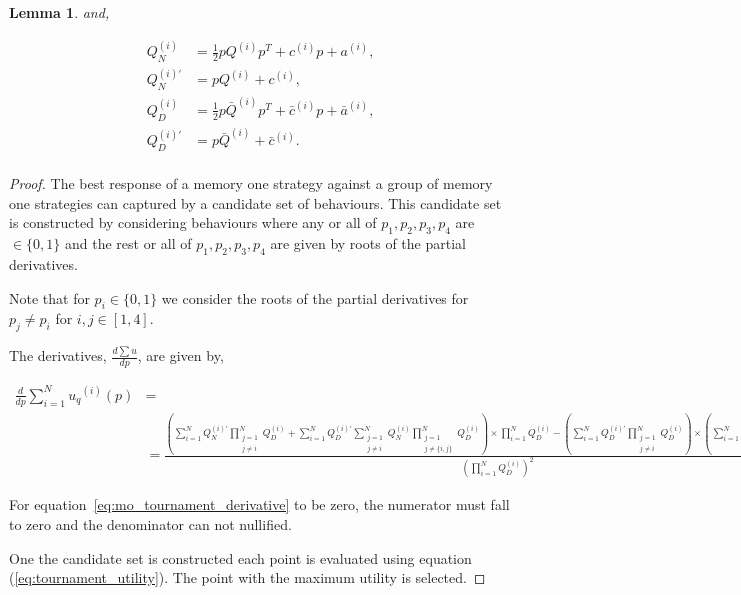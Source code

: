 \documentclass[10pt]{article}
\newtheorem{lemma}[theorem]{Lemma}
\begin{document}
\begin{lemma}
    and,

    \begin{align*}
        Q_{N}^{(i) } & = \frac{1}{2} pQ^{(i)} p^T + c^{(i)} p + a^ {(i)}, \\
        Q_{N}^{(i)'} & =  pQ^{(i)} + c^{(i)}, \\
        Q_{D}^{(i) } & = \frac{1}{2} p\bar{Q}^{(i)} p^T + \bar{c}^{(i)} p + \bar{a}^ {(i)}, \\
        Q_{D}^{(i)'} & =  p\bar{Q}^{(i)} + \bar{c}^{(i)}. \\
    \end{align*}
\end{lemma}

\begin{proof}
    The best response of a memory one strategy against a group of memory
    one strategies can captured by a candidate set of behaviours. This candidate
    set is constructed by considering behaviours where any or all of \(p_1, p_2, p_3, p_4\)
    are \(\in \{0, 1\}\) and the rest or all of \(p_1, p_2, p_3, p_4\) are given by
    roots of the partial derivatives.

    Note that for \(p_i \in \{0, 1\}\) we consider the roots of the partial derivatives
    for \(p_j \neq p_i\) for \(i,j \in [1, 4]\).

    The derivatives, \(\frac{d\sum u}{dp}\), are given by,

    {\scriptsize
    \begin{align}\label{eq:mo_tournament_derivative}
        \frac{d}{dp} \sum\limits_{i=1} ^ {N} {u_q}^{(i)} (p) & = \nonumber \\
        & =\frac{
        (\sum\limits_{i=1} ^ {N} Q_{N}^{(i)'} \prod_{\substack{j=1 \\ j \neq i}} ^ N Q_{D}^{(i)}
        + \sum\limits_{i=1} ^ {N} Q_{D}^{(i)'} \sum_{\substack{j=1 \\ j \neq i}} ^ {N} Q_{N}^{(i)}
       \prod_{\substack{j=1 \\ j \neq \{i, j\}}} ^ N Q_{D}^{(i)}) \times
       \prod\limits_{i=1} ^ N Q_{D}^{(i)} - (\sum\limits_{i=1} ^ {N} Q_{D}^{(i)'}
       \prod_{\substack{j=1 \\ j \neq i}} ^ N Q_{D}^{(i)}) \times
       (\sum\limits_{i=1} ^ {N} Q_{N}^{(i)} \prod_{\substack{j=1 \\ j \neq i}} ^ N Q_{D}^{(i)})}
        {(\prod\limits_{i=1} ^ N Q_{D}^{(i)})^{2}}
    \end{align}
    }

    For equation~\ref{eq:mo_tournament_derivative} to be zero, the numerator must fall
    to zero and the denominator can not nullified.

    One the candidate set is constructed each point is evaluated using equation
    (\ref{eq:tournament_utility}). The point with the maximum utility is selected.
\end{proof}
\end{document}
